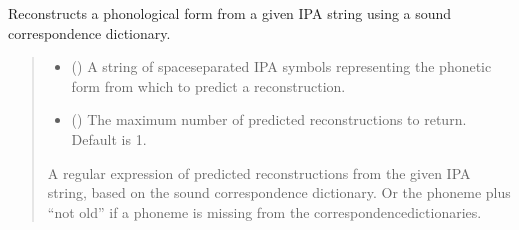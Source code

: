 \documentclass[letterpaper,10pt,english]{sphinxmanual}
\begin{document}
\begin{fulllineitems}
\begin{fulllineitems}
\begin{sphinxVerbatim}[commandchars=\\\{\}]
\PYG{p}{[} \PYG{p}{]} 
\end{sphinxVerbatim}

\end{fulllineitems}


\begin{fulllineitems}
\label{\detokenize{documentation:loanpy.scapplier.Adrc.reconstruct}}
\pysigstartsignatures
{}
\pysigstopsignatures
\sphinxAtStartPar
Reconstructs a phonological form from a given IPA string using
a sound correspondence dictionary.
\begin{quote}\begin{description}
\begin{itemize}
\item {} 
\sphinxAtStartPar
{} () \textendash{} A string of space\sphinxhyphen{}separated IPA symbols representing
the phonetic form from which to predict a
reconstruction.

\item {} 
\sphinxAtStartPar
{} () \textendash{} The maximum number of predicted reconstructions to
return. Default is 1.

\end{itemize}

\sphinxAtStartPar
A regular expression of predicted reconstructions from the
given IPA string, based on the sound correspondence
dictionary. Or the phoneme plus “not old” if a phoneme is
missing from the correspondence\sphinxhyphen{}dictionaries.


\end{description}
\end{quote}
\end{fulllineitems}
\end{fulllineitems}
\end{document}
